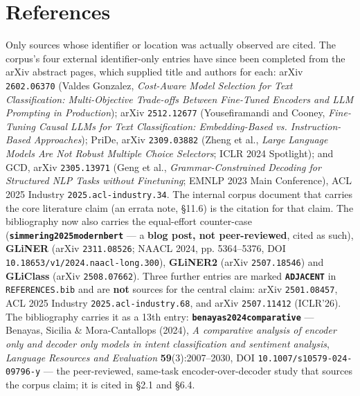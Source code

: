 \documentclass[10pt]{article}
\begin{document}
\section*{References}
Only sources whose identifier or location was actually observed are cited. The corpus's four external identifier-only entries have since been completed from the arXiv abstract pages, which supplied title and authors for each: arXiv \texttt{2602.06370}\cite{arxiv2602_06370} (Valdes Gonzalez, \emph{Cost-Aware Model Selection for Text Classification: Multi-Objective Trade-offs Between Fine-Tuned Encoders and LLM Prompting in Production}); arXiv \texttt{2512.12677}\cite{arxiv2512_12677} (Yousefiramandi and Cooney, \emph{Fine-Tuning Causal LLMs for Text Classification: Embedding-Based vs. Instruction-Based Approaches}); PriDe, arXiv \texttt{2309.03882}\cite{pride2309_03882} (Zheng et al., \emph{Large Language Models Are Not Robust Multiple Choice Selectors}; ICLR 2024 Spotlight); and GCD, arXiv \texttt{2305.13971}\cite{gcd2305_13971} (Geng et al., \emph{Grammar-Constrained Decoding for Structured NLP Tasks without Finetuning}; EMNLP 2023 Main Conference), ACL 2025 Industry \texttt{2025.acl-industry.34}. The internal corpus document that carries the core literature claim (an errata note, \S11.6) is the citation for that claim. The bibliography now also carries the equal-effort counter-case (\textbf{\texttt{simmering2025modernbert}\cite{simmering2025modernbert}} --- a \textbf{blog post, not peer-reviewed}, cited as such), \textbf{GLiNER} (arXiv \texttt{2311.08526}; NAACL 2024, pp. 5364--5376, DOI \texttt{10.18653/v1/2024.naacl-long.300}), \textbf{GLiNER2} (arXiv \texttt{2507.18546}) and \textbf{GLiClass} (arXiv \texttt{2508.07662}). Three further entries are marked \textbf{\texttt{ADJACENT}} in \texttt{REFERENCES.bib} and are \textbf{not} sources for the central claim: arXiv \texttt{2501.08457}, ACL 2025 Industry \texttt{2025.acl-industry.68}, and arXiv \texttt{2507.11412} (ICLR'26). The bibliography carries it as a 13th entry: \textbf{\texttt{benayas2024comparative}\cite{benayas2024comparative}} --- Benayas, Sicilia \& Mora-Cantallops (2024), \emph{A comparative analysis of encoder only and decoder only models in intent classification and sentiment analysis}, \emph{Language Resources and Evaluation} \textbf{59}(3):2007--2030, DOI \texttt{10.1007/s10579-024-09796-y} --- the peer-reviewed, same-task encoder-over-decoder study that sources the corpus claim; it is cited in \S2.1 and \S6.4.
\end{document}
